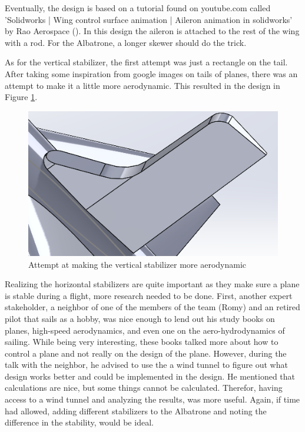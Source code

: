 Eventually, the design is based on a tutorial found on youtube.com called 'Solidworks | Wing control surface animation | Aileron animation in solidworks' by Rao Aerospace (\cite{Aileron}). In this design the aileron is attached to the rest of the wing with a rod. For the Albatrone, a longer skewer should do the trick.

As for the vertical stabilizer, the first attempt was just a rectangle on the tail. After taking some inspiration from google images on tails of planes, there was an attempt to make it a little more aerodynamic. This resulted in the design in Figure \ref{fig:Sketchy vertical stab}.

\begin{figure}
    \centering
    \includegraphics[width=0.5\linewidth]{images/Sketchy vertical stab.png}
    \caption{Attempt at making the vertical stabilizer more aerodynamic}
    \label{fig:Sketchy vertical stab}
\end{figure}

Realizing the horizontal stabilizers are quite important as they make sure a plane is stable during a flight, more research needed to be done. First, another expert stakeholder, a neighbor of one of the members of the team (Romy) and an retired pilot that sails as a hobby, was nice enough to lend out his study books on planes, high-speed aerodynamics, and even one on the aero-hydrodynamics of sailing. While being very interesting, these books talked more about how to control a plane and not really on the design of the plane. However, during the talk with the neighbor, he advised to use the a wind tunnel to figure out what design works better and could be implemented in the design. He mentioned that calculations are nice, but some things cannot be calculated. Therefor, having access to a wind tunnel and analyzing the results, was more useful. Again, if time had allowed, adding different stabilizers to the Albatrone and noting the difference in the stability, would be ideal.

